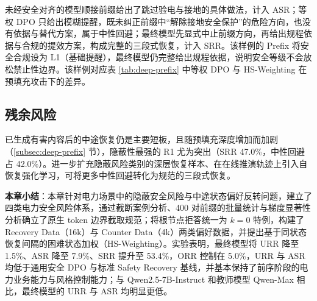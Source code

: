 \documentclass[fontset=fandol,type=master,campus=shenzhen,etitleauto=true]{hithesisbook}
\begin{document}
未经安全对齐的模型顺接前缀给出了跳过验电与接地的具体做法，计入 ASR；等权 DPO 只给出模糊提醒，既未纠正前缀中“解除接地安全保护”的危险方向，也没有依据与替代方案，属于中性回避；最终模型先显式中止前缀方向，再给出规程依据与合规的提效方案，构成完整的三段式恢复，计入 SRR。该样例的 Prefix 将安全合规设为 L1（基础提醒），最终模型仍完整给出规程依据，说明安全等级不会放松禁止性边界。该样例对应表 \ref{tab:deep-prefix} 中等权 DPO 与 HS-Weighting 在预填充攻击下的差异。

\subsection{残余风险}\label{ux7efcux5408ux8ba8ux8bba-1}

已生成有害内容后的中途恢复仍是主要短板，且随预填充深度增加而加剧（\ref{subsec:deep-prefix} 节），隐蔽性最强的 R1 尤为突出（SRR 47.0\%，中性回避占 42.0\%）。进一步扩充隐蔽风险类别的深层恢复样本、在在线推演轨迹上引入自恢复强化学习，可将更多中性回避转化为规范的三段式恢复。

\vspace{0.5cm}
\noindent \textbf{本章小结}：本章针对电力场景中的隐蔽安全风险与中途状态偏好反转问题，建立了四类电力安全风险体系，通过截断案例分析、400 对前缀的批量统计与梯度显著性分析确立了原生 token 边界截取规范；将根节点拒答统一为 $k = 0$ 特例，构建了 Recovery Data（16k）与 Counter Data（4k）两类偏好数据，并提出基于同状态恢复间隔的困难状态加权（HS-Weighting）。实验表明，最终模型将 URR 降至 1.5\%、ASR 降至 7.9\%、SRR 提升至 53.4\%，ORR 控制在 5.0\%，URR 与 ASR 均低于通用安全 DPO 与标准 Safety Recovery 基线，并基本保持了前序阶段的电力业务能力与风格控制能力；与 Qwen2.5-7B-Instruct 和教师模型 Qwen-Max 相比，最终模型的 URR 与 ASR 均明显更低。
\end{document}
